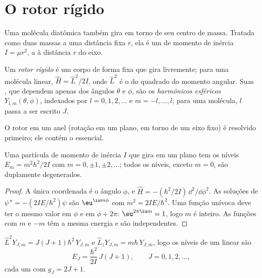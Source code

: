 \section{O rotor rígido}

Uma molécula diatômica também gira em torno de seu centro de massa. Tratada
como duas massas a uma distância fixa $r$, ela é um  de momento
de inércia $I = \mu r^2$, a  à distância $r$ do eixo.

\begin{definition}\label{def:b3:quantum-model-systems:rotor}
Um \emph{rotor rígido} é um corpo de forma fixa que gira
livremente; para uma molécula linear, $\hat H = \hat L^2/2I$, onde $\hat L^2$ é o
 do quadrado do momento angular. Suas , que dependem
apenas dos ângulos $\theta$ e $\phi$, são os \emph{harmônicos
esféricos} $Y_{l,m}(\theta,\phi)$, indexados por $l =
0, 1, 2, \dots$ e $m = -l, \dots, l$; para uma molécula, $l$ passa a ser escrito $J$.
\end{definition}

O rotor em um anel (rotação em um plano, em torno de um eixo fixo) é
resolvido primeiro; ele contém o essencial.

\begin{theorem}[O anel]\label{thm:b3:quantum-model-systems:ring}
Uma partícula de momento de inércia $I$ que gira em um plano tem os níveis
$E_m = m^2\hbar^2/2I$ com $m = 0, \pm1, \pm2, \dots$; todos os níveis, exceto
$m = 0$, são duplamente degenerados.
\end{theorem}

\begin{proof}
A única coordenada é o ângulo $\phi$, e $\hat H = -(\hbar^2/2I)\,
\dd^2/\dd\phi^2$. As soluções de $\psi'' = -(2IE/\hbar^2)\psi$ são $\eu^{\iu
m\phi}$ com $m^2 = 2IE/\hbar^2$. Uma função unívoca deve ter o mesmo
valor em $\phi$ e em $\phi + 2\pi$: $\eu^{2\pi\iu m} = 1$, logo $m$ é inteiro.
As funções com $m$ e $-m$ têm a mesma energia e são independentes.
\end{proof}

\begin{theorem}\label{thm:b3:quantum-model-systems:rotor}
$\hat L^2Y_{J,m} = J(J+1)\hbar^2\,Y_{J,m}$ e $\hat L_zY_{J,m} = m\hbar\,
Y_{J,m}$, logo os níveis de um  linear são
\[
E_J = \frac{\hbar^2}{2I}\,J(J+1), \qquad J = 0, 1, 2, \dots,
\]
cada um com  $g_J = 2J + 1$.
\end{theorem}
\admitted

